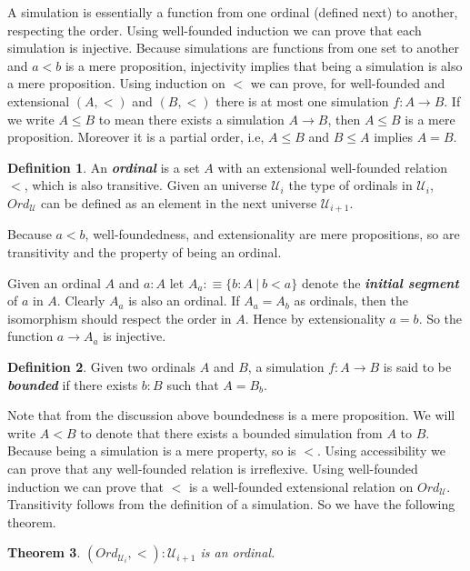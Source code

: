 \documentclass[10pt]{article}
\theoremstyle{definition}
\newtheorem{definition}{Definition}[section]
\theoremstyle{plain}
\newtheorem{theorem}[definition]{Theorem}
\theoremstyle{remark}
\newcommand{\U}{\mathscr{U}}
\begin{document}
A simulation is essentially a function from one ordinal (defined next) to another, 
respecting the order. Using well-founded induction we can prove that each simulation is 
injective. Because simulations are functions from one set to another and $a<b$ is a mere 
proposition, injectivity implies that being a simulation is also a mere proposition. Using 
induction on $<$ we can prove, for well-founded and extensional $(A,<)$ and $(B,<)$
there is at most one simulation $f:A \to B$. If we write $A \leq B$ to mean there exists a 
simulation $A \to B$, then $A \leq B$ is a mere proposition. Moreover it is a partial order, 
i.e, $A \leq B$ and $B \leq A$ implies $A = B$. 

\begin{definition}\label{D:Ordinal}
An \textbf{\textit{ordinal}} is a set $A$ with an extensional well-founded relation $<$, which
is also transitive. Given an universe $\U_i$ the type of ordinals in $\U_{i}$, ${Ord}_{\U}$
can be defined as an element in the next universe $\U_{i+1}$.
\end{definition}

Because $a < b$, well-foundedness, and extensionality are mere propositions, so are
transitivity and the property of being an ordinal.\smallskip

Given an ordinal $A$ and $a : A$ let $A_a :\equiv \{ b : A\ |\ b < a\}$ denote the 
\textbf{\textit{initial segment}} of $a$ in $A$. Clearly $A_a$ is also an ordinal. If 
$A_a = A_b$ as ordinals, then the isomorphism should respect the order in $A$. Hence by 
extensionality $a = b$. So the function $a \to A_a$ is injective. 

\begin{definition}\label{D:Bdd sim}
Given two ordinals $A$ and $B$, a simulation $f : A \to B$ is said to be 
\textbf{\textit{bounded}} if there exists $b : B$ such that $A = B_b$. 
\end{definition}

Note that from the discussion above boundedness is a mere proposition. We will write 
$A < B$ to denote that there exists a bounded simulation from $A$ to $B$. Because being a 
simulation is a mere property, so is $<$. Using accessibility we can prove that any 
well-founded relation is irreflexive. Using well-founded induction we can prove that $<$
is a well-founded extensional relation on ${Ord}_{\U}$. Transitivity follows from 
the definition of a simulation. So we have the following theorem.
\begin{theorem}
$({Ord}_{\U_i},<) : \U_{i+1}$ is an ordinal.
\end{theorem}
\end{document}

